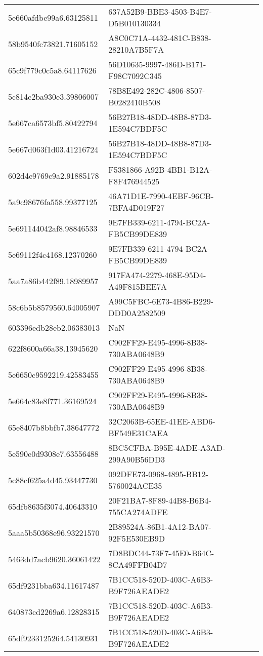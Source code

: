 \begin{tabular}{ll}
5e660afdbe99a6.63125811 & 637A52B9-BBE3-4503-B4E7-D5B010130334 \\
58b9540fc73821.71605152 & A8C0C71A-4432-481C-B838-28210A7B5F7A \\
65c9f779c0c5a8.64117626 & 56D10635-9997-486D-B171-F98C7092C345 \\
5c814c2ba930e3.39806007 & 78B8E492-282C-4806-8507-B0282410B508 \\
5e667ca6573bf5.80422794 & 56B27B18-48DD-48B8-87D3-1E594C7BDF5C \\
5e667d063f1d03.41216724 & 56B27B18-48DD-48B8-87D3-1E594C7BDF5C \\
602d4e9769c9a2.91885178 & F5381866-A92B-4BB1-B12A-F8F476944525 \\
5a9c98676fa558.99377125 & 46A71D1E-7990-4EBF-96CB-7BFA4D019F27 \\
5e691144042af8.98846533 & 9E7FB339-6211-4794-BC2A-FB5CB99DE839 \\
5e69112f4c4168.12370260 & 9E7FB339-6211-4794-BC2A-FB5CB99DE839 \\
5aa7a86b442f89.18989957 & 917FA474-2279-468E-95D4-A49F815BEE7A \\
58c6b5b8579560.64005907 & A99C5FBC-6E73-4B86-B229-DDD0A2582509 \\
603396edb28eb2.06383013 & NaN \\
622f8600a66a38.13945620 & C902FF29-E495-4996-8B38-730ABA0648B9 \\
5e6650c9592219.42583455 & C902FF29-E495-4996-8B38-730ABA0648B9 \\
5e664c83e8f771.36169524 & C902FF29-E495-4996-8B38-730ABA0648B9 \\
65e8407b8bbfb7.38647772 & 32C2063B-65EE-41EE-ABD6-BF549E31CAEA \\
5e590e0d9308e7.63556488 & 8BC5CFBA-B95E-4ADE-A3AD-299A90B56DD3 \\
5c88cf625a4d45.93447730 & 092DFE73-0968-4895-BB12-5760024ACE35 \\
65dfb8635f3074.40643310 & 20F21BA7-8F89-44B8-B6B4-755CA274ADFE \\
5aaa5b50368e96.93221570 & 2B89524A-86B1-4A12-BA07-92F5E530EB9D \\
5463dd7acb9620.36061422 & 7D8BDC44-73F7-45E0-B64C-8CA49FFB04D7 \\
65df9231bba634.11617487 & 7B1CC518-520D-403C-A6B3-B9F726AEADE2 \\
640873cd2269a6.12828315 & 7B1CC518-520D-403C-A6B3-B9F726AEADE2 \\
65df9233125264.54130931 & 7B1CC518-520D-403C-A6B3-B9F726AEADE2 \\

\end{tabular}

